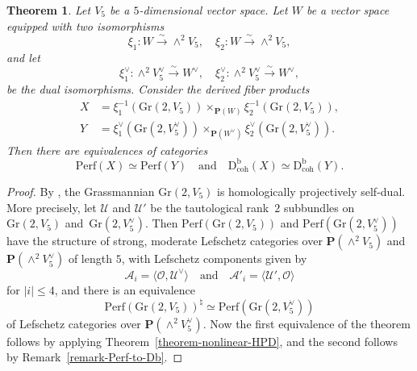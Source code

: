 \documentclass[11pt, reqno]{amsart}
\numberwithin{equation}{section}
\theoremstyle{plain}
\newtheorem{theorem}{Theorem}[section]
\theoremstyle{definition}
\newcommand{\Perf}{\mathrm{Perf}}
\newcommand{\Db}{\mathrm{D^b_{coh}}}
\newcommand{\hpd}{{\natural}}
\newcommand{\svee}{\scriptscriptstyle\vee}
\newcommand{\Gr}{\mathrm{Gr}}
\newcommand{\cUv}{\mathcal{U}^{\svee}}
\newcommand{\vV}{V^{\svee}}
\newcommand{\cO}{\mathcal{O}}
\newcommand{\cA}{\mathcal{A}}
\newcommand{\cU}{\mathcal{U}}
\newcommand{\bP}{\mathbf{P}}
\begin{document}
\begin{theorem}
\label{theorem-Gr-intersection} 
Let $V_5$ be a $5$-dimensional vector space. 
Let $W$ be a vector space equipped with two isomorphisms 
\begin{equation*}
\xi_1 \colon W \xrightarrow{\sim} \wedge^2 V_5 , \quad 
\xi_2 \colon W \xrightarrow{\sim} \wedge^2 V_5,  
\end{equation*}
and let 
\begin{equation*}
\xi_1^{\svee} \colon  \wedge^2 V_5^{\svee} \xrightarrow{\sim} W^{\svee} , \quad 
\xi_2^{\svee} \colon \wedge^2 V_5^{\svee} \xrightarrow{\sim} W^{\svee},  
\end{equation*}
be the dual isomorphisms. 
Consider the derived fiber products
\begin{align*}
X & = \xi_1^{-1}(\Gr(2,V_5)) \times_{\bP(W)} \xi_{2}^{-1}(\Gr(2,V_5))  , \\ 
Y & = \xi_1^{\svee}(\Gr(2,V_5^{\svee})) \times_{\bP(W^{\svee})} \xi_{2}^{\svee}(\Gr(2,V_5^{\svee})) . 
\end{align*}
Then there are equivalences of categories 
\begin{equation*}
\Perf(X) \simeq \Perf(Y) \quad \text{and} \quad \Db(X) \simeq \Db(Y). 
\end{equation*}
\end{theorem}

\begin{proof}
By \cite[Section~6.1 and Theorem~1.2]{kuznetsov2006hyperplane}, the Grassmannian 
$\Gr(2,V_5)$ is homologically projectively self-dual. 
More precisely, 
let $\cU$ and $\cU'$ be the tautological rank~$2$ subbundles on~$\Gr(2,V_5)$ and~$\Gr(2,\vV_5)$. 
Then $\Perf(\Gr(2,V_5))$ and $\Perf(\Gr(2,\vV_5))$ have the structure of 
strong, moderate Lefschetz categories over $\bP(\wedge^2V_5)$ and $\bP(\wedge^2\vV_5)$ 
of length $5$, with Lefschetz components given by 
\begin{equation*}
\cA_i  = \langle \cO , \cUv \rangle \quad \text{and} \quad 
\cA'_i  = \langle \cU', \cO \rangle   
\end{equation*} 
for $|i| \leq 4$, and there is an equivalence 
\begin{equation*}
\Perf(\Gr(2,V_5))^{\hpd} \simeq \Perf(\Gr(2,\vV_5))
\end{equation*}
of Lefschetz categories over $\bP(\wedge^2\vV_5)$. 
Now the first equivalence of the theorem follows by applying Theorem~\ref{theorem-nonlinear-HPD}, 
and the second follows by Remark~\ref{remark-Perf-to-Db}. 
\end{proof} 
\end{document}
